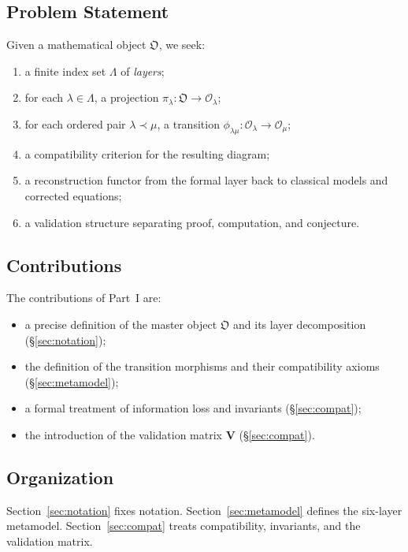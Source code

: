 \documentclass[11pt,a4paper]{article}
\theoremstyle{definition}
\theoremstyle{plain}
\newcommand{\Lam}{\Lambda}
\newcommand{\Ob}{\mathfrak{O}}
\newcommand{\Ocal}{\mathcal{O}}
\newcommand{\philam}{\phi_{\lambda\mu}}
\newcommand{\Vmat}{\mathbf{V}}
\begin{document}
\subsection{Problem Statement}

Given a mathematical object $\Ob$, we seek:
\begin{enumerate}[label=(\roman*)]
  \item a finite index set $\Lam$ of \emph{layers};
  \item for each $\lambda \in \Lam$, a projection
        $\pi_\lambda : \Ob \to \Ocal_\lambda$;
  \item for each ordered pair $\lambda \prec \mu$, a transition
        $\philam : \Ocal_\lambda \to \Ocal_\mu$;
  \item a compatibility criterion for the resulting diagram;
  \item a reconstruction functor from the formal layer back to
        classical models and corrected equations;
  \item a validation structure separating proof, computation, and
        conjecture.
\end{enumerate}

\subsection{Contributions}

The contributions of Part~I are:
\begin{itemize}
  \item a precise definition of the master object $\Ob$ and its
        layer decomposition (\S\ref{sec:notation});
  \item the definition of the transition morphisms and their
        compatibility axioms (\S\ref{sec:metamodel});
  \item a formal treatment of information loss and invariants
        (\S\ref{sec:compat});
  \item the introduction of the validation matrix $\Vmat$
        (\S\ref{sec:compat}).
\end{itemize}

\subsection{Organization}

Section~\ref{sec:notation} fixes notation. Section~\ref{sec:metamodel}
defines the six-layer metamodel. Section~\ref{sec:compat} treats
compatibility, invariants, and the validation matrix.
\end{document}
